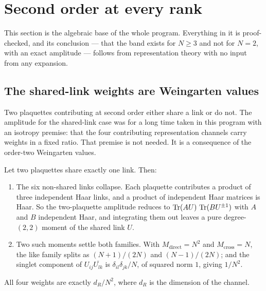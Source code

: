 \section{Second order at every rank}
\label{sec:second}

This section is the algebraic base of the whole program. Everything in
it is proof-checked, and its conclusion --- that the band exists for
$N \ge 3$ and not for $N = 2$, with an exact amplitude --- follows from
representation theory with no input from any expansion.

\subsection{The shared-link weights are Weingarten values}

Two plaquettes contributing at second order either share a link or do
not. The amplitude for the shared-link case was for a long time taken
in this program with an isotropy premise: that the four contributing
representation channels carry weights in a fixed ratio. That premise
is not needed. It is a consequence of the order-two Weingarten values.

\begin{proposition}
\label{prop:weingarten}
Let two plaquettes share exactly one link. Then:
\begin{enumerate}
  \item The six non-shared links collapse. Each plaquette contributes a
    product of three independent Haar links, and a product of
    independent Haar matrices is Haar. So the two-plaquette amplitude
    reduces to $\operatorname{Tr}(A U)\,\operatorname{Tr}(B U^{\pm 1})$ with $A$ and $B$ independent
    Haar, and integrating them out leaves a pure degree-$(2,2)$ moment of
    the shared link $U$.
  \item Two such moments settle both families. With
    $M_{\mathrm{direct}} = N^2$ and $M_{\mathrm{cross}} = N$, the like
    family splits as $(N+1)/(2N)$ and $(N-1)/(2N)$; and the singlet
    component of $U_{ij}\overline{U_{lk}}$ is
    $\delta_{il}\delta_{jk}/N$, of squared norm $1$, giving $1/N^2$.
\end{enumerate}
All four weights are exactly $d_R/N^2$, where $d_R$ is the dimension of
the channel.
\end{proposition}

